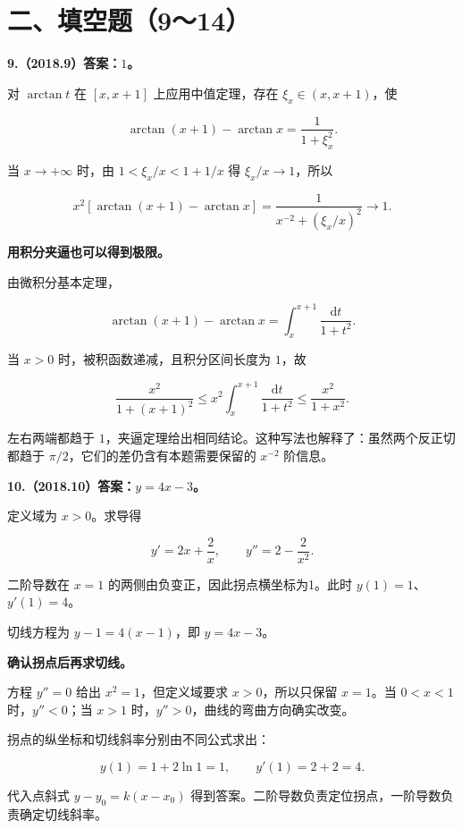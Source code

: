 \documentclass[UTF8,11pt,fontset=windows]{ctexart}
\begin{document}
\clearpage

\section*{二、填空题（9～14）}

\textbf{9.（2018.9）答案：$1$。}

对 $\arctan t$ 在 $[x,x+1]$ 上应用中值定理，存在 $\xi_x\in(x,x+1)$，使

$$
\arctan(x+1)-\arctan x=\frac1{1+\xi_x^2}.
$$

当 $x\to+\infty$ 时，由 $1<\xi_x/x<1+1/x$ 得 $\xi_x/x\to1$，所以

$$
x^2[\arctan(x+1)-\arctan x]
=\frac1{x^{-2}+(\xi_x/x)^2}\longrightarrow1.
$$

\textbf{用积分夹逼也可以得到极限。}

由微积分基本定理，

$$
\arctan(x+1)-\arctan x=\int_x^{x+1}\frac{\mathrm dt}{1+t^2}.
$$

当 $x>0$ 时，被积函数递减，且积分区间长度为 $1$，故

$$
\frac{x^2}{1+(x+1)^2}
\le x^2\int_x^{x+1}\frac{\mathrm dt}{1+t^2}
\le\frac{x^2}{1+x^2}.
$$

左右两端都趋于 $1$，夹逼定理给出相同结论。这种写法也解释了：虽然两个反正切都趋于 $\pi/2$，它们的差仍含有本题需要保留的 $x^{-2}$ 阶信息。

\clearpage

\textbf{10.（2018.10）答案：$y=4x-3$。}

定义域为 $x>0$。求导得

$$
y'=2x+\frac2x,
\qquad y''=2-\frac2{x^2}.
$$

二阶导数在 $x=1$ 的两侧由负变正，因此拐点横坐标为1。此时 $y(1)=1$、$y'(1)=4$。

切线方程为 $y-1=4(x-1)$，即 $y=4x-3$。

\textbf{确认拐点后再求切线。}

方程 $y''=0$ 给出 $x^2=1$，但定义域要求 $x>0$，所以只保留 $x=1$。当 $0<x<1$ 时，$y''<0$；当 $x>1$ 时，$y''>0$，曲线的弯曲方向确实改变。

拐点的纵坐标和切线斜率分别由不同公式求出：

$$
y(1)=1+2\ln1=1,
\qquad
y'(1)=2+2=4.
$$

代入点斜式 $y-y_0=k(x-x_0)$ 得到答案。二阶导数负责定位拐点，一阶导数负责确定切线斜率。

\clearpage
\end{document}

